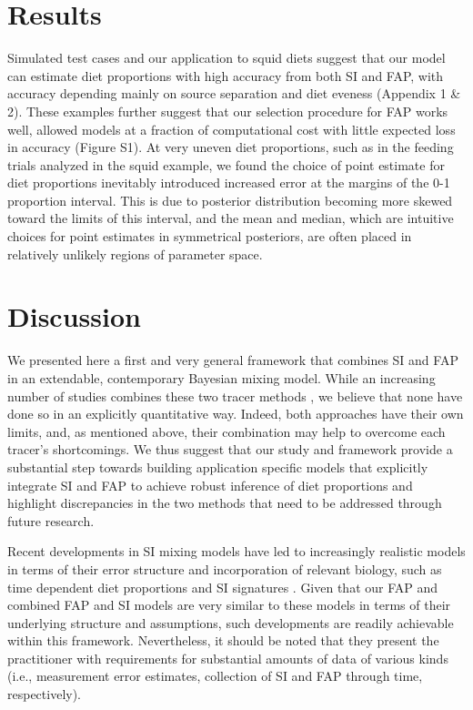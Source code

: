 \documentclass[12pt]{article}%
\begin{document}
\begin{spacing}{1.9}
\begin{flushleft}
\section{Results}

Simulated test cases and our application to squid diets suggest that our model can estimate diet proportions with high accuracy from both SI and FAP, with accuracy depending mainly on source separation and diet eveness (Appendix 1 \& 2). These examples further suggest that our selection procedure for FAP works well, allowed models at a fraction of computational cost with little expected loss in accuracy (Figure S1). At very uneven diet proportions, such as in the feeding trials analyzed in the squid example, we found the choice of point estimate for diet proportions inevitably introduced increased error at the margins of the 0-1 proportion interval. This is due to posterior distribution becoming more skewed toward the limits of this interval, and the mean and median, which are intuitive choices for point estimates in symmetrical posteriors, are often placed in relatively unlikely regions of parameter space.

\section{Discussion}

We presented here a first and very general framework that combines SI
and FAP in an extendable, contemporary Bayesian mixing model. While an
increasing number of studies combines these two tracer methods
\citep{tucker_convergence_2008, guest_evidence_2008,guest_trophic_2009,stowasser_experimental_2006,van_der_bank_dietary_2011,jaschinski_carbon_2008},
we believe that none have done so in an explicitly quantitative
way. Indeed, both approaches have their own limits, and, as mentioned
above, their combination may help to overcome each tracer’s
shortcomings. We thus suggest that our study and framework provide a
substantial step towards building application specific models that
explicitly integrate SI and FAP to achieve robust inference of diet
proportions and highlight discrepancies in the two methods that need
to be addressed through future research.

Recent developments in SI mixing models have led to increasingly
realistic models in terms of their error structure \citep{hopkins_estimating_2012} and
incorporation of relevant biology, such as time dependent diet
proportions and SI signatures \citep{parnell_bayesian_2012}. Given that our FAP and combined
FAP and SI models are very similar to these models in terms of their
underlying structure and assumptions, such developments are readily
achievable within this framework. Nevertheless, it should be noted
that they present the practitioner with requirements for substantial
amounts of data of various kinds (i.e., measurement error estimates,
collection of SI and FAP through time, respectively).


\end{flushleft}
\end{spacing}
\end{document}
